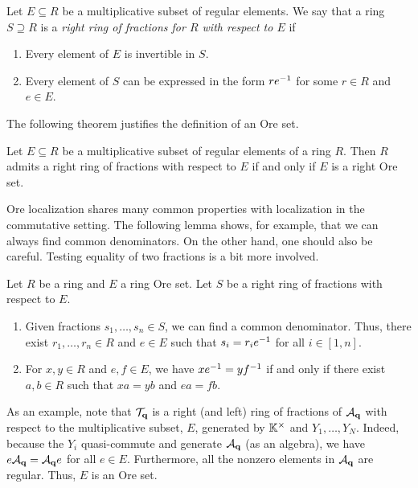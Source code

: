 Let $E \subseteq R$ be a multiplicative subset of regular elements. We say that a ring
$S \supseteq R$ is a \emph{right ring of fractions for $R$ with respect to
	$E$} if
\begin{enumerate}
	\item Every element of $E$ is invertible in $S$.
	\item Every element of $S$ can be expressed in the form $re^{-1}$ for some $r \in R$ and $e
		      \in E$.
\end{enumerate}
The following theorem justifies the definition of an Ore set.
\begin{theorem}\cite[Theorem 6.2]{GoodearlWarfield2004NoncommutativeNR}
	Let $E \subseteq R$ be a multiplicative subset of regular elements of a ring $R$. Then $R$ admits a right ring of fractions with respect to $E$ if and only if $E$ is a right Ore set.
\end{theorem}
%
Ore localization shares many common properties with localization in the commutative
setting. The following lemma shows, for example, that we can always find common
denominators. On the other hand, one should also be careful. Testing equality of two
fractions is a bit more involved.
\begin{lemma}\label{lem:ore_set_properties}
	Let $R$ be a ring and $E$ a ring Ore set. Let $S$ be a right ring of fractions with respect to $E$.
	\begin{enumerate}
		\item Given fractions $s_1, \dots, s_n \in S$, we can find a common denominator. Thus, there
		      exist $r_1, \dots, r_n \in R$ and $e \in E$ such that $s_i = r_i e^{-1}$ for all $i \in
			      [1, n]$.
		\item For $x, y \in R$ and $e, f \in E$, we have $x e ^{-1} = y f ^{-1}$ if and only if there
		      exist $a,b \in R$ such that $xa = yb$ and $ea = fb$.
	\end{enumerate}
\end{lemma}

As an example, note that $\mathcal{T}_{\mathbf{q}}$ is a right (and left) ring of fractions of
$\mathcal{A}_{\mathbf{q}}$ with respect to the multiplicative subset, $E$, generated by $\mathbb{K}^\times$
and $Y_1, \dots, Y_N$. Indeed, because the $Y_i$ quasi-commute and generate $\mathcal{A}_{\mathbf{q}}$
(as an algebra), we have $e \mathcal{A}_{\mathbf{q}} = \mathcal{A}_{\mathbf{q}} e$ for all $e \in E$. Furthermore,
all the nonzero elements in $\mathcal{A}_{\mathbf{q}}$ are regular. Thus, $E$ is an Ore set.

